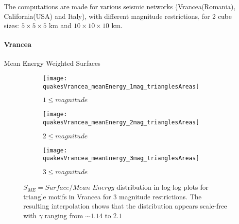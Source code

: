 The computations are made for various seismic networks (Vrancea(Romania), California(USA) and Italy), with different magnitude restrictions, for 2 cube sizes: $5\times5\times5$ km and $10\times10\times10$ km.


\clearpage
\paragraph{Vrancea} Mean Energy Weighted Surfaces
\begin{figure}[h!]
\begin{subfigure}{.99\textwidth}
  \centering
  \texttt{[image: quakesVrancea\_meanEnergy\_1mag\_trianglesAreas]}
  \caption{$1 \leq magnitude$}
  \label{fig:trianglesVrME1}
\end{subfigure}%

\begin{subfigure}{.99\textwidth}
  \centering
  \texttt{[image: quakesVrancea\_meanEnergy\_2mag\_trianglesAreas]}
  \caption{$2 \leq magnitude$}
  \label{fig:trianglesVrME2}
\end{subfigure}%

\begin{subfigure}{.99\textwidth}
  \centering
  \texttt{[image: quakesVrancea\_meanEnergy\_3mag\_trianglesAreas]}
  \caption{$3 \leq magnitude$}
  \label{fig:trianglesVrME3}
\end{subfigure}%

\caption{$S_{ME} = Surface/Mean$ $Energy$ distribution in log-log plots for triangle motifs in Vrancea for 3 magnitude restrictions. The resulting interpolation shows that the distribution appears scale-free with $\gamma$ ranging from $\sim 1.14$ to $2.1$ }
\label{fig:trianglesSurfacesVrME}
\end{figure}


\clearpage

